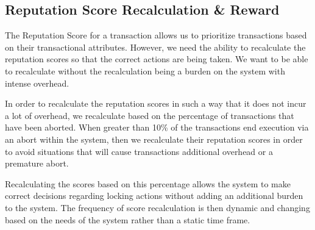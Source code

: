 \subsection{Reputation Score Recalculation \& Reward}
\label{sec:recalculation_and_reward}

The Reputation Score for a transaction allows us to prioritize transactions based on their transactional attributes. However, we need the ability to recalculate the reputation scores so that the correct actions are being taken. We want to be able to recalculate without the recalculation being a burden on the system with intense overhead.

In order to recalculate the reputation scores in such a way that it does not incur a lot of overhead, we recalculate based on the percentage of transactions that have been aborted. When greater than 10\% of the transactions end execution via an abort within the system, then we recalculate their reputation scores in order to avoid situations that will cause transactions additional overhead or a premature abort.

Recalculating the scores based on this percentage allows the system to make correct decisions regarding locking actions without adding an additional burden to the system. The frequency of score recalculation is then dynamic and changing based on the needs of the system rather than a static time frame. 


